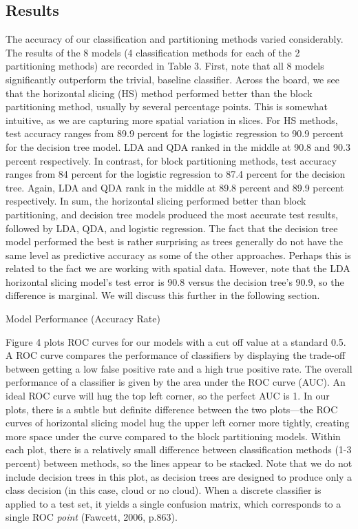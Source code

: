 \documentclass[12pt]{article}
\begin{document}
\subsection{Results}
The accuracy of our classification and partitioning methods varied considerably. The results of the 8 models (4 classification methods for each of the 2 partitioning methods) are recorded in Table 3. First, note that all 8 models significantly outperform the trivial, baseline classifier. Across the board, we see that the horizontal slicing (HS) method performed better than the block partitioning method, usually by several percentage points. This is somewhat intuitive, as we are capturing more spatial variation in slices. For HS methods, test accuracy ranges from 89.9 percent for the logistic regression to 90.9 percent for the decision tree model. LDA and QDA ranked in the middle at 90.8 and 90.3 percent respectively. In contrast, for block partitioning methods, test accuracy ranges from 84 percent for the logistic regression to 87.4 percent for the decision tree. Again, LDA and QDA rank in the middle at 89.8 percent and 89.9 percent respectively. In sum, the horizontal slicing performed better than block partitioning, and decision tree models produced the most accurate test results, followed by LDA, QDA, and logistic regression. The fact that the decision tree model performed the best is rather surprising as trees generally do not have the same level as predictive accuracy as some of the other approaches. Perhaps this is related to the fact we are working with spatial data. However, note that the LDA horizontal slicing model's test error is 90.8 versus the decision tree's 90.9, so the difference is marginal. We will discuss this further in the following section. 
\begin{table}[htp!]
    \centering
    \caption{Model Performance (Accuracy Rate)}
   
\end{table}
\newline
\noindent Figure 4 plots ROC curves for our models with a cut off value at a standard 0.5. A ROC curve compares the performance of classifiers by displaying the trade-off between getting a low false positive rate and a high true positive rate. The overall performance of a classifier is given by the area under the ROC curve (AUC). An ideal ROC curve will hug the top left corner, so the perfect AUC is 1. In our plots, there is a subtle but definite difference between the two plots---the ROC curves of horizontal slicing model hug the upper left corner more tightly, creating more space under the curve compared to the block partitioning models. Within each plot, there is a relatively small difference between classification methods (1-3 percent) between methods, so the lines appear to be stacked. Note that we do not include decision trees in this plot, as decision trees are designed to produce only a class decision (in this case, cloud or no cloud). When a discrete classifier is applied to a test set, it yields a single confusion matrix, which corresponds to a single ROC \textit{point} (Fawcett, 2006, p.863). 
\end{document}
